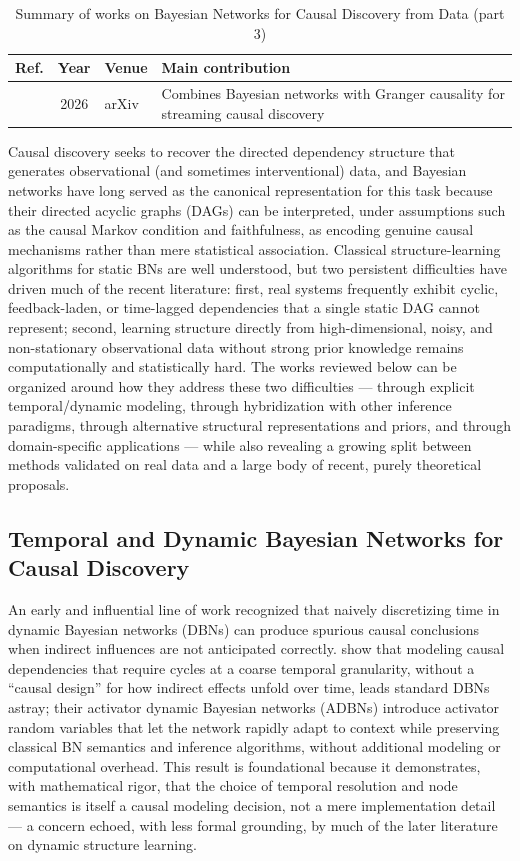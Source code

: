 \begin{table}[!t]
\centering
\renewcommand{\arraystretch}{1.2}
\caption{Summary of works on Bayesian Networks for Causal Discovery from Data (part 3)}
\begin{tabularx}{\textwidth}{@{}l c p{3.6cm} X@{}}
\toprule
\textbf{Ref.} & \textbf{Year} & \textbf{Venue} & \textbf{Main contribution} \\
\midrule
\cite{zhang2026causals} & 2026 & arXiv & Combines Bayesian networks with Granger causality for streaming causal discovery \\
\bottomrule
\end{tabularx}
\end{table}

Causal discovery seeks to recover the directed dependency structure that generates observational (and sometimes interventional) data, and Bayesian networks have long served as the canonical representation for this task because their directed acyclic graphs (DAGs) can be interpreted, under assumptions such as the causal Markov condition and faithfulness, as encoding genuine causal mechanisms rather than mere statistical association. Classical structure-learning algorithms for static BNs are well understood, but two persistent difficulties have driven much of the recent literature: first, real systems frequently exhibit cyclic, feedback-laden, or time-lagged dependencies that a single static DAG cannot represent; second, learning structure directly from high-dimensional, noisy, and non-stationary observational data without strong prior knowledge remains computationally and statistically hard. The works reviewed below can be organized around how they address these two difficulties --- through explicit temporal/dynamic modeling, through hybridization with other inference paradigms, through alternative structural representations and priors, and through domain-specific applications --- while also revealing a growing split between methods validated on real data and a large body of recent, purely theoretical proposals.

\subsection{Temporal and Dynamic Bayesian Networks for Causal Discovery}
An early and influential line of work recognized that naively discretizing time in dynamic Bayesian networks (DBNs) can produce spurious causal conclusions when indirect influences are not anticipated correctly. \cite{motzek2017indirect} show that modeling causal dependencies that require cycles at a coarse temporal granularity, without a ``causal design'' for how indirect effects unfold over time, leads standard DBNs astray; their activator dynamic Bayesian networks (ADBNs) introduce activator random variables that let the network rapidly adapt to context while preserving classical BN semantics and inference algorithms, without additional modeling or computational overhead. This result is foundational because it demonstrates, with mathematical rigor, that the choice of temporal resolution and node semantics is itself a causal modeling decision, not a mere implementation detail --- a concern echoed, with less formal grounding, by much of the later literature on dynamic structure learning.

